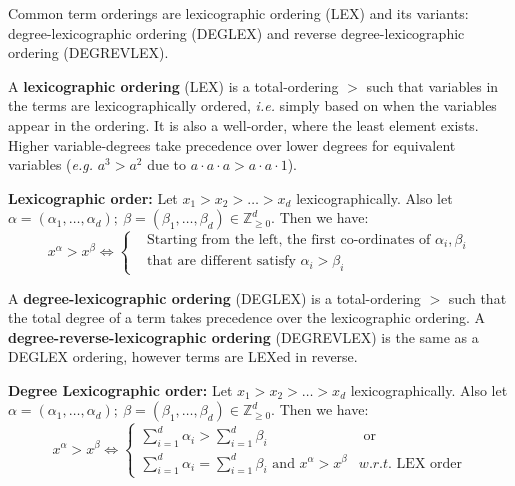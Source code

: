 Common term orderings are lexicographic ordering (LEX) and its variants: 
degree-lexicographic ordering (DEGLEX) and reverse degree-lexicographic ordering (DEGREVLEX).

A {\bf lexicographic ordering} (LEX) is a total-ordering $>$ such that 
variables in the terms are lexicographically ordered, {\it i.e.} simply based on 
when the variables appear in the ordering. It is also a well-order, where the least element exists.
Higher variable-degrees take 
precedence over lower degrees for equivalent variables ({\it e.g.} $a^3 > a^2$ due to $a \cdot a \cdot a > a \cdot a \cdot 1$).
\begin{Definition}
{\bf Lexicographic order:} Let $x_1 > x_2 > \dots > x_d$
lexicographically. Also let $\alpha = (\alpha_1, \dots, \alpha_d);
~\beta = (\beta_1, \dots, \beta_d) \in \mathbb{Z}^d_{\geq 0}$. Then we
have: 
\begin{equation}
x^{\alpha} > x^{\beta} \iff 
\begin{cases}
& \text{Starting  from the  left, the first co-ordinates of $\alpha_i, \beta_i$} \\
& \text{that are different satisfy $\alpha_i > \beta_i$}

\end{cases}
\end{equation}
\end{Definition}

A {\bf degree-lexicographic ordering} (DEGLEX) is a total-ordering $>$ such 
that the total degree of a term takes precedence over the lexicographic 
ordering.  
A {\bf degree-reverse-lexicographic ordering} (DEGREVLEX) is the same as a
DEGLEX ordering, however terms are LEXed in reverse.

\begin{Definition}
{\bf Degree Lexicographic order:} Let $x_1 > x_2 > \dots > x_d$
lexicographically. Also let $\alpha = (\alpha_1, \dots, \alpha_d);
~\beta = (\beta_1, \dots, \beta_d) \in \mathbb{Z}^d_{\geq 0}$. Then we
have: 
\begin{equation}
x^{\alpha} > x^{\beta} \iff 
\begin{cases}
\sum_{i=1}^{d}\alpha_i > \sum_{i=1}^{d} \beta_i & \text{ or }\\
\sum_{i=1}^{d}\alpha_i = \sum_{i=1}^{d} \beta_i  \text{ and }
x^{\alpha} > x^{\beta} & \textit{w.r.t.}\text{ LEX order}
\end{cases}
\end{equation}
\end{Definition}


